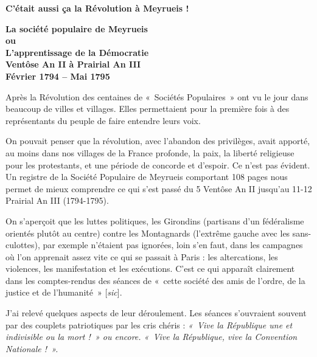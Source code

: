 

{\fontsize{10.15}{11.9}\selectfont


\begin{center}
{\Large\bfseries C’était aussi ça la Révolution à Meyrueis !}

\vspace{0.65em}

{\bfseries
La société populaire de Meyrueis\\
ou\\
L’apprentissage de la Démocratie\\
Ventôse An II à Prairial An III\\
Février 1794 -- Mai 1795
}
\end{center}

\vspace{0.45em}

Après la Révolution des centaines de «~Sociétés Populaires~» ont vu le jour dans beaucoup de villes et villages. Elles permettaient pour la première fois à des représentants du peuple de faire entendre leurs voix.

On pouvait penser que la révolution, avec l’abandon des privilèges, avait apporté, au moins dans nos villages de la France profonde, la paix, la liberté religieuse pour les protestants, et une période de concorde et d’espoir. Ce n’est pas évident.
Un registre de la Société Populaire de Meyrueis comportant 108 pages nous permet de mieux comprendre ce qui s’est passé du 5 Ventôse An II jusqu’au 11-12 Prairial An III (1794-1795).

On s’aperçoit que les luttes politiques, les Girondins (partisans d’un fédéralisme orientés plutôt au centre) contre les Montagnards (l’extrême gauche avec les sans-culottes), par exemple n’étaient pas ignorées, loin s’en faut, dans les campagnes où l’on apprenait assez vite ce qui se passait à Paris : les altercations, les violences, les manifestation et les exécutions.
C’est ce qui apparaît clairement dans les comptes-rendus des séances de «~cette société des amis de l’ordre, de la justice et de l’humanité~» [\textit{sic}].

J’ai relevé quelques aspects de leur déroulement. Les séances s’ouvraient souvent par des couplets patriotiques par les cris chéris : \textit{«~Vive la République une et indivisible ou la mort !~» ou encore. «~Vive la République, vive la Convention Nationale !~».}

}
